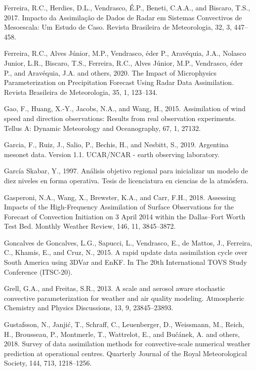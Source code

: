 \documentclass[12pt,oneside]{reedthesis}
\begin{document}
\leavevmode\hypertarget{ref-ferreira2017}{}%
Ferreira, R.C., Herdies, D.L., Vendrasco, É.P., Beneti, C.A.A., and Biscaro, T.S., 2017. Impacto da Assimilação de Dados de Radar em Sistemas Convectivos de Mesoescala: Um Estudo de Caso. Revista Brasileira de Meteorologia, 32, 3, 447--458.

\leavevmode\hypertarget{ref-ferreira2020}{}%
Ferreira, R.C., Alves Júnior, M.P., Vendrasco, éder P., Aravéquia, J.A., Nolasco Junior, L.R., Biscaro, T.S., Ferreira, R.C., Alves Júnior, M.P., Vendrasco, éder P., and Aravéquia, J.A. and others, 2020. The Impact of Microphysics Parameterization on Precipitation Forecast Using Radar Data Assimilation. Revista Brasileira de Meteorologia, 35, 1, 123--134.

\leavevmode\hypertarget{ref-gao2015}{}%
Gao, F., Huang, X.-Y., Jacobs, N.A., and Wang, H., 2015. Assimilation of wind speed and direction observations: Results from real observation experiments. Tellus A: Dynamic Meteorology and Oceanography, 67, 1, 27132.

\leavevmode\hypertarget{ref-garcia2019}{}%
Garcia, F., Ruiz, J., Salio, P., Bechis, H., and Nesbitt, S., 2019. Argentina mesonet data. Version 1.1. UCAR/NCAR - earth observing laboratory.

\leavevmode\hypertarget{ref-garciaskabar1997}{}%
García Skabar, Y., 1997. Análisis objetivo regional para inicializar un modelo de diez niveles en forma operativa. Tesis de licenciatura en ciencias de la atmósfera.

\leavevmode\hypertarget{ref-gasperoni2018}{}%
Gasperoni, N.A., Wang, X., Brewster, K.A., and Carr, F.H., 2018. Assessing Impacts of the High-Frequency Assimilation of Surface Observations for the Forecast of Convection Initiation on 3 April 2014 within the Dallas--Fort Worth Test Bed. Monthly Weather Review, 146, 11, 3845--3872.

\leavevmode\hypertarget{ref-goncalvesdegoncalves2015}{}%
Goncalves de Goncalves, L.G., Sapucci, L., Vendrasco, E., de Mattos, J., Ferreira, C., Khamis, E., and Cruz, N., 2015. A rapid update data assimilation cycle over South America using 3DVar and EnKF. In The 20th International TOVS Study Conference (ITSC-20).

\leavevmode\hypertarget{ref-grell2013}{}%
Grell, G.A., and Freitas, S.R., 2013. A scale and aerosol aware stochastic convective parameterization for weather and air quality modeling. Atmospheric Chemistry and Physics Discussions, 13, 9, 23845--23893.

\leavevmode\hypertarget{ref-gustafsson2018}{}%
Gustafsson, N., Janjić, T., Schraff, C., Leuenberger, D., Weissmann, M., Reich, H., Brousseau, P., Montmerle, T., Wattrelot, E., and Bučánek, A. and others, 2018. Survey of data assimilation methods for convective‐scale numerical weather prediction at operational centres. Quarterly Journal of the Royal Meteorological Society, 144, 713, 1218--1256.
\end{document}
